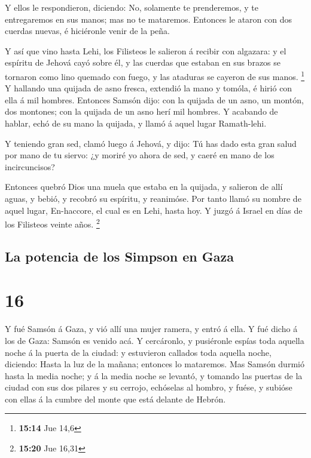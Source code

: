  Y ellos le respondieron, diciendo: No, solamente te
prenderemos, y te entregaremos en sus manos; mas no te mataremos.
Entonces le ataron con dos cuerdas nuevas, é hiciéronle venir de la
peña.

 Y así que vino hasta Lehi, los Filisteos le salieron á
recibir con algazara: y el espíritu de Jehová cayó sobre él, y las
cuerdas que estaban en sus brazos se tornaron como lino quemado con
fuego, y las ataduras se cayeron de sus manos. \footnote{\textbf{15:14}
  Jue 14,6}  Y hallando una quijada de asno fresca,
extendió la mano y tomóla, é hirió con ella á mil hombres. 
Entonces Samsón dijo: con la quijada de un asno, un montón, dos
montones; con la quijada de un asno herí mil hombres.  Y
acabando de hablar, echó de su mano la quijada, y llamó á aquel lugar
Ramath-lehi.

 Y teniendo gran sed, clamó luego á Jehová, y dijo: Tú has
dado esta gran salud por mano de tu siervo: ¿y moriré yo ahora de sed, y
caeré en mano de los incircuncisos?

 Entonces quebró Dios una muela que estaba en la quijada, y
salieron de allí aguas, y bebió, y recobró su espíritu, y reanimóse. Por
tanto llamó su nombre de aquel lugar, En-haccore, el cual es en Lehi,
hasta hoy.  Y juzgó á Israel en días de los Filisteos
veinte años. \footnote{\textbf{15:20} Jue 16,31}

\hypertarget{la-potencia-de-los-simpson-en-gaza}{%
\subsection{La potencia de los Simpson en
Gaza}\label{la-potencia-de-los-simpson-en-gaza}}

\hypertarget{section-15}{%
\section{16}\label{section-15}}

 Y fué Samsón á Gaza, y vió allí una mujer ramera, y entró á
ella.  Y fué dicho á los de Gaza: Samsón es venido acá. Y
cercáronlo, y pusiéronle espías toda aquella noche á la puerta de la
ciudad: y estuvieron callados toda aquella noche, diciendo: Hasta la luz
de la mañana; entonces lo mataremos.  Mas Samsón durmió
hasta la media noche; y á la media noche se levantó, y tomando las
puertas de la ciudad con sus dos pilares y su cerrojo, echóselas al
hombro, y fuése, y subióse con ellas á la cumbre del monte que está
delante de Hebrón.

